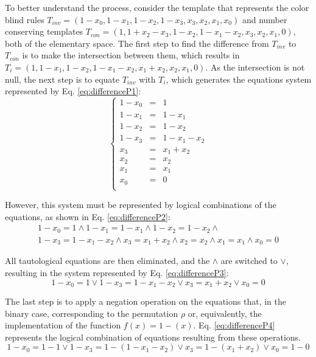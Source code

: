 \documentclass{llncs}
\begin{document}
To better understand the process, consider the template that represents the color blind rules $T_{inv} = (1 - x_0, 1 - x_1, 1 - x_2, 1 - x_3, x_3, x_2, x_1, x_0)$ and number conserving templates $T_{con} = (1, 1 + x_2 - x_3, 1 - x_2, 1 - x_1 - x_2, x_3, x_2, x_1, 0)$, both of the elementary space. The first step to find the difference from $T_{inv}$ to $T_{con}$ is to make the intersection between them, which results in $T_i = (1, 1 - x_1, 1 - x_2, 1 - x_1 - x_2, x_1 + x_2, x_2, x_1, 0)$. As the intersection is not null, the next step is to equate $T_{inv}$ with $T_i$, which generates the equations system represented by Eq. \ref{eq:differenceP1}: \begin{equation} \left\{\begin{matrix} 1 - x_0 & = & 1       \\ 1 - x_1  & = & 1 - x_1     \\ 1 - x_2  & = & 1 - x_2     \\ 1 - x_3  & = & 1 - x_1 - x_2 \\
x_3   & = & x_1 + x_2   \\
x_2   & = & x_2       \\
x_1   & = & x_1       \\
x_0   & = & 0       \\
\end{matrix}\right.
\label{eq:differenceP1}
\end{equation}

However, this system must be represented by logical combinations of the equations, as shown in Eq. \ref{eq:differenceP2}:
\begin{equation}
\begin{split}
1 - x_0 = 1       \wedge
1 - x_1 = 1 - x_1   \wedge
1 - x_2 = 1 - x_2   \wedge\\
1 - x_3 = 1 - x_1 - x_2 \wedge 
x_3   = x_1 + x_2   \wedge
x_2   = x_2     \wedge
x_1   = x_1     \wedge
x_0   = 0       
\label{eq:differenceP2}
\end{split}
\end{equation}

All tautological equations are then eliminated, and the $\wedge$ are switched to $\vee$, resulting in the system represented by Eq. \ref{eq:differenceP3}:
\begin{equation}
1 - x_0 = 1       \vee 
1 - x_3 = 1 - x_1 - x_2 \vee
x_3   = x_1 + x_2   \vee 
x_0   = 0       
\label{eq:differenceP3}
\end{equation}

The last step is to apply a negation operation on the equations that, in the binary case, corresponding to the permutation $\rho $ or, equivalently, the implementation of the function $f(x) = 1 - (x)$. Eq. \ref{eq:differenceP4} represents the logical combination of equations resulting from these operations.
\begin{equation}
1 - x_0 = 1 - 1         \vee 
1 - x_3 = 1 - (1 - x_1 - x_2) \vee
x_3   = 1 - (x_1 + x_2)   \vee 
x_0   = 1 - 0       
\label{eq:differenceP4}
\end{equation}
\end{document}
